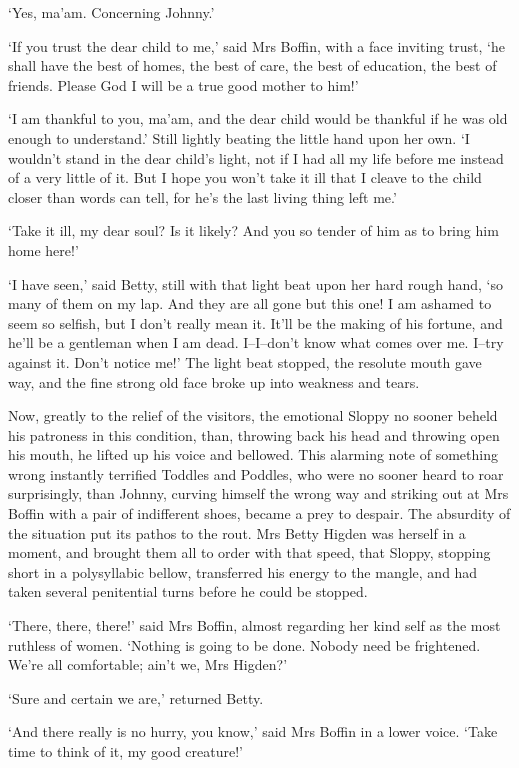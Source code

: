‘Yes, ma’am. Concerning Johnny.’

‘If you trust the dear child to me,’ said Mrs Boffin, with a face
inviting trust, ‘he shall have the best of homes, the best of care, the
best of education, the best of friends. Please God I will be a true good
mother to him!’

‘I am thankful to you, ma’am, and the dear child would be thankful if
he was old enough to understand.’ Still lightly beating the little hand
upon her own. ‘I wouldn’t stand in the dear child’s light, not if I had
all my life before me instead of a very little of it. But I hope you
won’t take it ill that I cleave to the child closer than words can tell,
for he’s the last living thing left me.’

‘Take it ill, my dear soul? Is it likely? And you so tender of him as to
bring him home here!’

‘I have seen,’ said Betty, still with that light beat upon her hard
rough hand, ‘so many of them on my lap. And they are all gone but this
one! I am ashamed to seem so selfish, but I don’t really mean it. It’ll
be the making of his fortune, and he’ll be a gentleman when I am dead.
I--I--don’t know what comes over me. I--try against it. Don’t notice
me!’ The light beat stopped, the resolute mouth gave way, and the fine
strong old face broke up into weakness and tears.

Now, greatly to the relief of the visitors, the emotional Sloppy no
sooner beheld his patroness in this condition, than, throwing back his
head and throwing open his mouth, he lifted up his voice and bellowed.
This alarming note of something wrong instantly terrified Toddles and
Poddles, who were no sooner heard to roar surprisingly, than Johnny,
curving himself the wrong way and striking out at Mrs Boffin with a pair
of indifferent shoes, became a prey to despair. The absurdity of the
situation put its pathos to the rout. Mrs Betty Higden was herself in
a moment, and brought them all to order with that speed, that Sloppy,
stopping short in a polysyllabic bellow, transferred his energy to
the mangle, and had taken several penitential turns before he could be
stopped.

‘There, there, there!’ said Mrs Boffin, almost regarding her kind self
as the most ruthless of women. ‘Nothing is going to be done. Nobody need
be frightened. We’re all comfortable; ain’t we, Mrs Higden?’

‘Sure and certain we are,’ returned Betty.

‘And there really is no hurry, you know,’ said Mrs Boffin in a lower
voice. ‘Take time to think of it, my good creature!’

